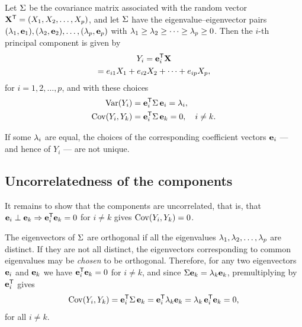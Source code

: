 \begin{theorem}
  \label{thm:pca_main}
  Let $\Sigma$ be the covariance matrix associated with the random vector
  $\mathbf{X}^{\mathsf{T}}=(X_1,X_2,\dots,X_p)$, and let $\Sigma$ have the
  eigenvalue--eigenvector pairs
  $(\lambda_1,\mathbf{e}_1),(\lambda_2,\mathbf{e}_2),\dots,(\lambda_p,\mathbf{e}_p)$ with
  $\lambda_1\ge\lambda_2\ge\dots\ge\lambda_p\ge 0$. Then the $i$-th principal component is
  given by
  \begin{multline}
    \label{eq:pc_definition}
    Y_i=\mathbf{e}_i^{\mathsf{T}}\mathbf{X}\\
    =e_{i1}X_1+e_{i2}X_2+\dots+e_{ip}X_p,
  \end{multline}
  for $i=1,2,\dots,p$, and with these choices
  \begin{align}
    \operatorname{Var}(Y_i)     &=\mathbf{e}_i^{\mathsf{T}}\Sigma\,\mathbf{e}_i=\lambda_i,
    \label{eq:pc_var}\\
    \operatorname{Cov}(Y_i,Y_k) &=\mathbf{e}_i^{\mathsf{T}}\Sigma\,\mathbf{e}_k=0,\quad i\neq k.
    \label{eq:pc_cov}
  \end{align}
\end{theorem}

\begin{remark}
  If some $\lambda_i$ are equal, the choices of the corresponding coefficient
  vectors $\mathbf{e}_i$ --- and hence of $Y_i$ --- are not unique.
\end{remark}

\subsection{Uncorrelatedness of the components}
\label{subsec:pca_uncorrelated}

It remains to show that the components are uncorrelated, that is, that
$\mathbf{e}_i\perp\mathbf{e}_k \Rightarrow \mathbf{e}_i^{\mathsf{T}}\mathbf{e}_k=0$ for $i\neq k$ gives
$\operatorname{Cov}(Y_i,Y_k)=0$.

The eigenvectors of $\Sigma$ are orthogonal if all the eigenvalues
$\lambda_1,\lambda_2,\dots,\lambda_p$ are distinct. If they are not all distinct, the
eigenvectors corresponding to common eigenvalues may be \emph{chosen} to be
orthogonal. Therefore, for any two eigenvectors $\mathbf{e}_i$ and $\mathbf{e}_k$ we
have $\mathbf{e}_i^{\mathsf{T}}\mathbf{e}_k=0$ for $i\neq k$, and since
$\Sigma\mathbf{e}_k=\lambda_k\mathbf{e}_k$, premultiplying by $\mathbf{e}_i^{\mathsf{T}}$ gives
\begin{equation}
  \label{eq:cov_zero}
  \operatorname{Cov}(Y_i,Y_k)=\mathbf{e}_i^{\mathsf{T}}\Sigma\,\mathbf{e}_k
  =\mathbf{e}_i^{\mathsf{T}}\lambda_k\mathbf{e}_k
  =\lambda_k\,\mathbf{e}_i^{\mathsf{T}}\mathbf{e}_k=0,
\end{equation}
for all $i\neq k$.

